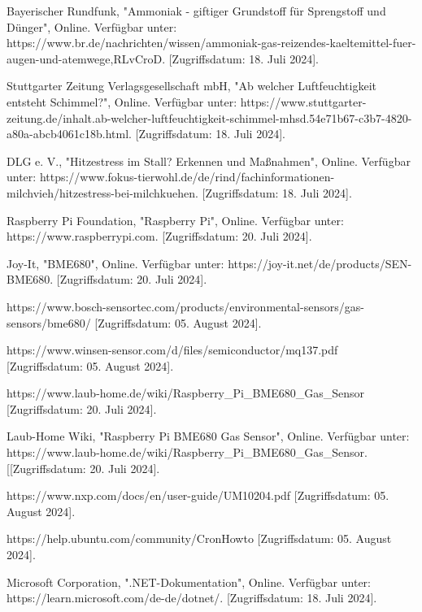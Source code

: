 \documentclass[conference]{IEEEtran}
\begin{document}
\newpage
\begin{thebibliography}{00}

Bayerischer Rundfunk, "Ammoniak - giftiger Grundstoff für Sprengstoff und Dünger", Online. Verfügbar unter: https://www.br.de/nachrichten/wissen/ammoniak-gas-reizendes-kaeltemittel-fuer-augen-und-atemwege,RLvCroD. [Zugriffsdatum: 18. Juli 2024].

Stuttgarter Zeitung Verlagsgesellschaft mbH, "Ab welcher Luftfeuchtigkeit entsteht Schimmel?", Online. Verfügbar unter: https://www.stuttgarter-zeitung.de/inhalt.ab-welcher-luftfeuchtigkeit-schimmel-mhsd.54e71b67-c3b7-4820-a80a-abcb4061c18b.html. [Zugriffsdatum: 18. Juli 2024].

DLG e. V., "Hitzestress im Stall? Erkennen und Maßnahmen", Online. Verfügbar unter: https://www.fokus-tierwohl.de/de/rind/fachinformationen-milchvieh/hitzestress-bei-milchkuehen. [Zugriffsdatum: 18. Juli 2024].

Raspberry Pi Foundation, "Raspberry Pi", Online. Verfügbar unter: https://www.raspberrypi.com. [Zugriffsdatum: 20. Juli 2024].

Joy-It, "BME680", Online. Verfügbar unter: https://joy-it.net/de/products/SEN-BME680. [Zugriffsdatum: 20. Juli 2024].

https://www.bosch-sensortec.com/products/environmental-sensors/gas-sensors/bme680/ [Zugriffsdatum: 05. August 2024].

https://www.winsen-sensor.com/d/files/semiconductor/mq137.pdf [Zugriffsdatum: 05. August 2024].

https://www.laub-home.de/wiki/Raspberry\_Pi\_BME680\_Gas\_Sensor [Zugriffsdatum: 20. Juli 2024].

Laub-Home Wiki, "Raspberry Pi BME680 Gas Sensor", Online. Verfügbar unter: https://www.laub-home.de/wiki/Raspberry\_Pi\_BME680\_Gas\_Sensor. [[Zugriffsdatum: 20. Juli 2024].

https://www.nxp.com/docs/en/user-guide/UM10204.pdf [Zugriffsdatum: 05. August 2024].

https://help.ubuntu.com/community/CronHowto [Zugriffsdatum: 05. August 2024].

Microsoft Corporation, ".NET-Dokumentation", Online. Verfügbar unter: https://learn.microsoft.com/de-de/dotnet/. [Zugriffsdatum: 18. Juli 2024].


\end{thebibliography}
\end{document}
